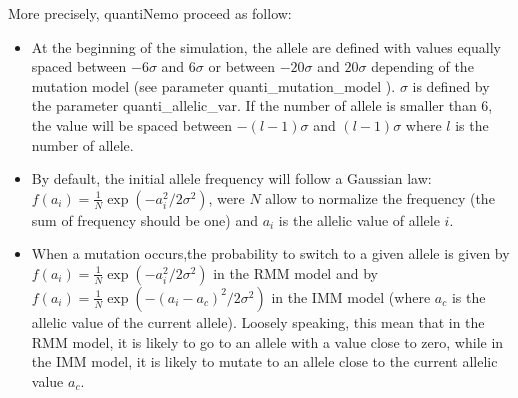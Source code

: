 \documentclass[letterpaper,12pt,oneside]{book}
\begin{document}
\begin{appendices}
More precisely, quantiNemo proceed as follow:
\begin{itemize}
\item	At the beginning of the simulation, the allele are defined with values equally spaced between $-6 \sigma$ and $6\sigma$ or between  $-20 \sigma$ and $20\sigma$ depending of the mutation model (see parameter \textsf{quanti\_mutation\_model} ).  $\sigma$ is defined by the parameter \textsf{quanti\_allelic\_var}. If the number of allele is smaller than $6$, the value will be spaced between  $-(l - 1)\sigma$ and $(l - 1)\sigma$ where $l$ is the number of allele. 
\item	 By default, the initial allele frequency will follow a Gaussian law: $f(a_i) = \frac{1}{N} \exp(-a_i^2/2\sigma^2)$, were $N$ allow to normalize the frequency (the sum of frequency should be one) and $a_i$ is the allelic value of allele $i$. 
\item	When a mutation occurs,the probability to switch to a given allele is given by $f(a_i) = \frac{1}{N} \exp(-a_i^2/2\sigma^2)$ in the RMM model and by $f(a_i) = \frac{1}{N} \exp(-(a_i-a_c)^2/2\sigma^2)$ in the IMM model (where $a_c$ is the allelic value of the current allele). Loosely speaking, this mean that in the RMM model, it is likely to go to an allele with a value close to zero, while in the IMM model, it is likely to mutate to an allele close to the current allelic value $a_c$. 
\end{itemize}


\end{appendices}
\end{document}
